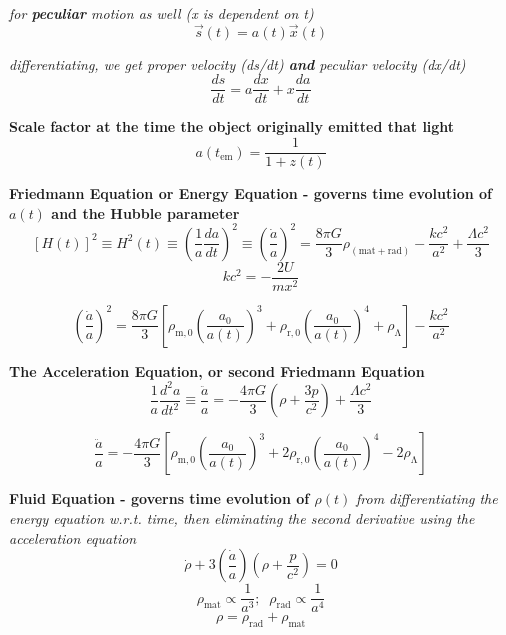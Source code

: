 \documentclass{article}
\begin{document}
\textit {for \textbf{peculiar} motion as well (x is dependent on t)}
\begin{equation}
\vec{s}(t) = a(t) \vec{x}(t)
\end{equation}

\textit{differentiating, we get proper velocity (ds/dt) \textbf{and} peculiar velocity (dx/dt)}
\begin{equation}
\frac {ds}{dt} = a \frac {dx}{dt} + x \frac {da}{dt}
\end{equation}

\textbf {Scale factor at the time the object originally emitted that light}
\begin{equation}
a(t_\mathrm{em}) = \frac {1}{1 + z(t)}
\end{equation}

\textbf {Friedmann Equation or Energy Equation - governs time evolution of \(a(t)\) and the Hubble parameter}
\begin{equation}
\left[H(t)\right]^2  \equiv  H^2(t)  \equiv \left(\frac {1}{a} \frac {da}{dt}\right)^2 \equiv \left(\frac {\dot{a}}{a}\right)^2 = \frac {8 \pi G}{3} \rho_\mathrm{(mat+rad)} - \frac {k c^2}{a^2} + \frac {\Lambda c^2}{3}
\end{equation}
\begin{equation}
k c^2 = - \frac {2U}{m x^2}  
\end{equation}

\begin{equation}
\left(\frac {\dot{a}}{a}\right)^2 = \frac {8 \pi G}{3} \left[ \rho_\mathrm{m,0} \left( \frac {a_\mathrm{0}}{a(t)} \right)^3 + \rho_\mathrm{r,0} \left(\frac {a_\mathrm{0}}{a(t)} \right)^4 + \rho_\mathrm{\Lambda} \right] - \frac {kc^2}{a^2}
\end{equation}

\textbf {The Acceleration Equation, or second Friedmann Equation}
\begin{equation}
\frac {1}{a} \frac {d^2a}{dt^2}\equiv \frac {\ddot{a}}{a} = - \frac {4 \pi G}{3} \left(\rho + \frac {3p}{c^2}\right) + \frac {\Lambda c^2}{3}
\end{equation}

\begin{equation}
\frac {\ddot{a}}{a} = - \frac {4 \pi G}{3} \left[ \rho_\mathrm{m,0} \left( \frac {a_\mathrm{0}}{a(t)} \right)^3 + 2\rho_\mathrm{r,0} \left(\frac {a_\mathrm{0}}{a(t)} \right)^4 -2\rho_\mathrm{\Lambda} \right]
\end{equation}

\textbf {Fluid Equation - governs time evolution of \(\rho(t)\)}
\textit {from differentiating the energy equation w.r.t. time, then eliminating the second derivative using the acceleration equation}
\begin{equation}
\dot{\rho} +3 \left(\frac {\dot{a}}{a}\right) \left(\rho + \frac {p}{c^2}\right) = 0
\end{equation}
\begin{equation}
\rho_{\mathrm{mat}} \propto \frac {1}{a^3} ; \; \; \rho_{\mathrm{rad}} \propto \frac {1}{a^4}
\end{equation}
\begin{equation}
\rho =  \rho_{\mathrm{rad}} + \rho_{\mathrm{mat}} 
\end{equation}
\end{document}
